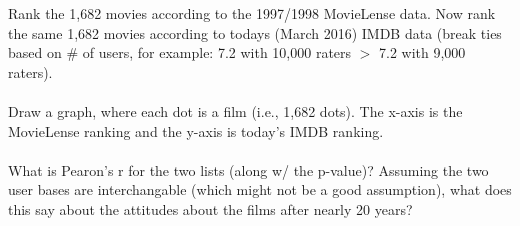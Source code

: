 Rank the 1,682 movies according to the 1997/1998 MovieLense
data.  Now rank the same 1,682 movies according to todays (March
2016) IMDB data (break ties based on \# of users, for example: 7.2
with 10,000 raters $>$ 7.2 with 9,000 raters).\\
\\
Draw a graph, where each dot is a film (i.e., 1,682 dots).  The
x-axis is the MovieLense ranking and the y-axis is today's IMDB
ranking.\\
\\
What is Pearon's r for the two lists (along w/ the p-value)?  Assuming
the two user bases are interchangable (which might not be a good
assumption), what does this say about the attitudes about the films
after nearly 20 years?